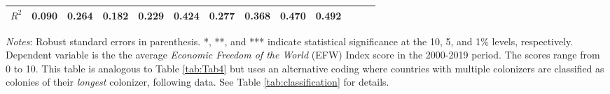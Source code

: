 \begin{sidewaystable}[h!]
\begin{threeparttable}
\begin{center}
\begin{minipage}{\textwidth}
\begin{tabular*}{\textwidth}{@{\extracolsep{\fill}}lcccccccccccc@{\extracolsep{\fill}}}
\(R^{2}\)   &       0.090         &       0.264         &       0.182         &       0.229         &       0.424         &       0.277         &       0.368         &       0.470         &       0.492         \\
\hline
\end{tabular*}
\begin{tablenotes}
\small
\item \textit{Notes}: Robust standard errors in parenthesis. *, **, and *** indicate statistical significance at the 10, 5, and 1\% levels, respectively. Dependent variable is the the average \textit{Economic Freedom of the World} (EFW) Index score in the 2000-2019 period. The scores range from 0 to 10. This table is analogous to Table \ref{tab:Tab4} but uses an alternative coding where countries with multiple colonizers are classified as colonies of their \textit{longest} colonizer, following \cite{COLDAT} data. See Table \ref{tab:classification} for details.
\end{tablenotes}
\end{minipage}
\end{center}
\end{threeparttable}
\end{sidewaystable}